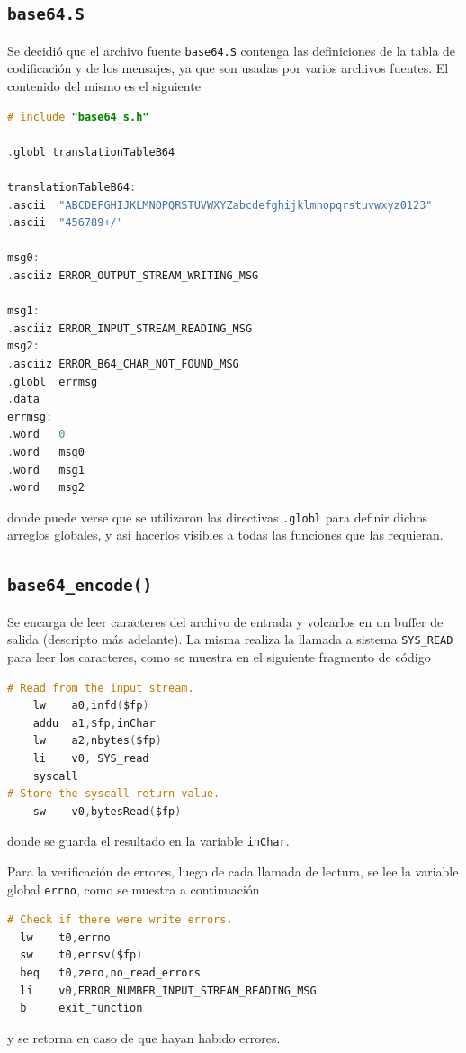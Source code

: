 \subsection{\texttt{base64.S}}
Se decidió que el archivo fuente \texttt{base64.S} contenga las definiciones de la tabla de codificación y de los mensajes, ya que son usadas por varios archivos fuentes. El contenido del mismo es el siguiente
\begin{lstlisting}[language=C, style=StyleC]
# include "base64_s.h"

.globl translationTableB64

translationTableB64:
.ascii	"ABCDEFGHIJKLMNOPQRSTUVWXYZabcdefghijklmnopqrstuvwxyz0123"
.ascii	"456789+/"

msg0:
.asciiz	ERROR_OUTPUT_STREAM_WRITING_MSG

msg1:
.asciiz	ERROR_INPUT_STREAM_READING_MSG
msg2:
.asciiz	ERROR_B64_CHAR_NOT_FOUND_MSG
.globl	errmsg
.data
errmsg:
.word	0
.word	msg0
.word	msg1
.word	msg2
\end{lstlisting}
donde puede verse que se utilizaron las directivas \texttt{.globl} para definir dichos arreglos globales, y así hacerlos visibles a todas las funciones que las requieran.

\subsection{\texttt{base64\_encode()}}

Se encarga de leer caracteres del archivo de entrada y volcarlos en un buffer de salida (descripto más adelante). La misma realiza la llamada a sistema \texttt{SYS\_READ} para leer los caracteres, como se muestra en el siguiente fragmento de código
\begin{lstlisting}[language=C, style=StyleC]
# Read from the input stream.
	lw	  a0,infd($fp)
	addu  a1,$fp,inChar
	lw	  a2,nbytes($fp)
	li    v0, SYS_read
	syscall
# Store the syscall return value.
	sw	  v0,bytesRead($fp)
\end{lstlisting}
donde se guarda el resultado en la variable \texttt{inChar}.

Para la verificación de errores, luego de cada llamada de lectura, se lee la variable global \texttt{errno}, como se muestra a continuación
\begin{lstlisting}[language=C, style=StyleC]
# Check if there were write errors.
  lw  	t0,errno
  sw	t0,errsv($fp)
  beq	t0,zero,no_read_errors
  li	v0,ERROR_NUMBER_INPUT_STREAM_READING_MSG
  b   	exit_function
\end{lstlisting}
y se retorna en caso de que hayan habido errores.

